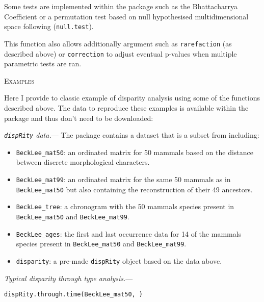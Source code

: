 \documentclass[12pt,letterpaper]{article}
\renewcommand{\section}[1]{%
\bigskip
\begin{center}
\begin{Large}
\normalfont\scshape #1
\medskip
\end{Large}
\end{center}}
\renewcommand{\subsubsection}[1]{%
\vspace{2ex}
\noindent
\textit{#1.}---}
\newcommand{\disp}{\texttt{dispRity} }
\begin{document}
Some tests are implemented within the package such as the Bhattacharrya Coefficient \citep[\texttt{bhatt.coeff}][]{Bhattacharyya,GuillermeCooper} or a permutation test based on null hypothesised multidimensional space following \cite{diaz2016global} (\texttt{null.test}).

This function also allows additionally argument such as \texttt{rarefaction} (as described above) or \texttt{correction} to adjust eventual p-values when multiple parametric tests are ran.

\section{Examples}
Here I provide to classic example of disparity analysis using some of the functions described above.
The data to reproduce these examples is available within the package and thus don't need to be downloaded:

\subsubsection{\disp data}
The package contains a dataset that is a subset from \cite{beckancient2014} including:

\begin{itemize}
    \item \texttt{BeckLee\_mat50}: an ordinated matrix for 50 mammals based on the distance between discrete morphological characters.
    \item \texttt{BeckLee\_mat99}: an ordinated matrix for the same 50 mammals as in \texttt{BeckLee\_mat50} but also containing the reconstruction of their 49 ancestors.
    \item \texttt{BeckLee\_tree}: a chronogram with the 50 mammals species present in \texttt{BeckLee\_mat50} and \texttt{BeckLee\_mat99}.
    \item \texttt{BeckLee\_ages}: the first and last occurrence data for 14 of the mammals species present in \texttt{BeckLee\_mat50} and \texttt{BeckLee\_mat99}.
    \item \texttt{disparity}: a pre-made \disp object based on the data above.
\end{itemize}

\subsubsection{Typical disparity through type analysis}

\texttt{dispRity.through.time(BeckLee\_mat50, )}
\end{document}
